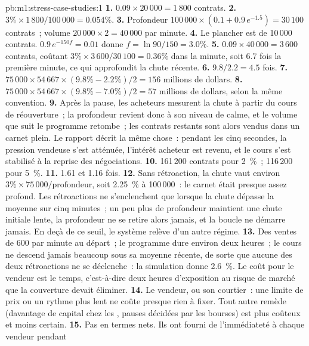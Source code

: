 \begin{solution}{pb:m1:stress-case-studies:1}
\textbf{1.} $0.09 \times 20\,000 = 1\,800$ contrats.
\textbf{2.} $3\% \times 1\,800/100\,000 = 0.054\%$.
\textbf{3.} Profondeur $100\,000 \times (0.1 + 0.9\,e^{-1.5}) = 30\,100$ contrats~; volume
$20\,000 \times 2 = 40\,000$ par minute.
\textbf{4.} Le plancher est de 10\,000 contrats. $0.9\,e^{-150 f} = 0.01$ donne $f =
\ln 90/150 = 3.0\%$.
\textbf{5.} $0.09 \times 40\,000 = 3\,600$ contrats, coûtant $3\% \times 3\,600/30\,100 =
0.36\%$ dans la minute, soit 6.7 fois la première minute, ce qui approfondit la
chute récente.
\textbf{6.} $9.8/2.2 = 4.5$ fois.
\textbf{7.} $75\,000 \times 54\,667 \times (9.8\% - 2.2\%)/2 = 156$ millions de dollars.
\textbf{8.} $75\,000 \times 54\,667 \times (9.8\% - 7.0\%)/2 = 57$ millions de dollars, selon
la même convention.
\textbf{9.} Après la pause, les acheteurs mesurent la chute à partir du cours de
réouverture~; la profondeur revient donc à son niveau de calme, et le volume que suit
le programme retombe~; les contrats restants sont alors vendus dans un carnet plein. Le rapport
décrit la même chose~: pendant les cinq secondes, la pression vendeuse s'est atténuée,
l'intérêt acheteur est revenu, et le cours s'est stabilisé à la reprise des négociations.
\textbf{10.} 161\,200 contrats pour 2~\%~; 116\,200 pour 5~\%.
\textbf{11.} 1.61 et 1.16 fois.
\textbf{12.} Sans rétroaction, la chute vaut environ $3\% \times 75\,000/\text{profondeur}$,
soit 2.25~\% à 100\,000~: le carnet était presque assez profond. Les rétroactions
ne s'enclenchent que lorsque la chute dépasse la moyenne sur cinq minutes~; un peu
plus de profondeur maintient une chute initiale lente, la profondeur ne se retire alors jamais, et la boucle ne
démarre jamais. En deçà de ce seuil, le système relève d'un autre régime.
\textbf{13.} Des ventes de 600 par minute au départ~; le programme dure environ deux heures~;
le cours ne descend jamais beaucoup sous sa moyenne récente, de sorte que
aucune des deux rétroactions ne se déclenche~: la simulation donne 2.6~\%. Le coût pour le
vendeur est le temps, c'est-à-dire deux heures d'exposition au risque de marché que la couverture devait éliminer.
\textbf{14.} Le vendeur, ou son courtier~: une limite de prix ou un rythme plus lent ne coûte
presque rien à fixer. Tout autre remède (davantage de capital chez les , pauses décidées par les bourses) est plus coûteux et moins certain.
\textbf{15.} Pas en termes nets. Ils ont fourni de l'immédiateté à chaque vendeur pendant

\end{solution}
